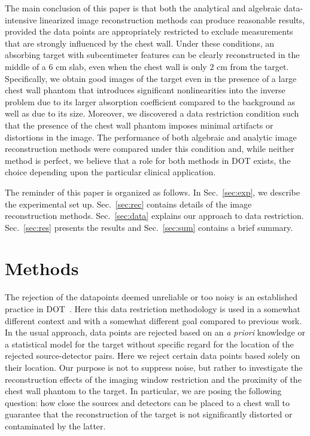 The main conclusion of this paper is that both the analytical and algebraic data-intensive linearized image reconstruction methods can produce reasonable results, provided the data points are appropriately restricted to exclude measurements that are strongly influenced by the chest wall. Under these conditions, an absorbing target with subcentimeter features can be clearly reconstructed in the middle of a $6$ cm slab, even when the chest wall is only $2$ cm from the target. Specifically, we obtain good images of the target even in the presence of a large chest wall phantom that introduces significant nonlinearities into the inverse problem due to its larger absorption coefficient compared to the background as well as due to its size. Moreover, we discovered a data restriction condition such that the presence of the chest wall phantom imposes minimal artifacts or distortions in the image. The performance of both algebraic and analytic image reconstruction methods were compared under this condition and, while
neither method is perfect, we believe that a role for both methods in DOT exists, the choice depending upon the particular clinical application.

The reminder of this paper is organized as follows. In Sec.~\ref{sec:exp}, we describe the experimental set up. Sec.~\ref{sec:rec} contains details of the image reconstruction methods. Sec.~\ref{sec:data} explains our approach to data restriction. Sec.~\ref{sec:res} presents the results and Sec.~\ref{sec:sum} contains a brief summary.

\section{Methods}
\label{sec:3_methods}

The rejection of the datapoints deemed unreliable or too noisy is an established practice in   DOT~\cite{blasi_07_1,franceschini_07_1,roche-labarbe_10_1,orihuela-espina_10_1}. Here this data restriction methodology is used in a somewhat different context and with a somewhat different goal compared to previous work. In the usual approach, data points are rejected based on an {\em a priori} knowledge or a statistical model for the target without specific regard for the location of the rejected source-detector pairs. Here we reject certain data points based solely on their location. Our purpose is not to suppress noise, but rather to investigate the reconstruction effects of the imaging window restriction and the proximity of the chest wall phantom to the target. In particular, we are posing the following question: how close the sources and detectors can be placed to a chest wall to guarantee that the reconstruction of the target is not significantly distorted or contaminated by the latter.

